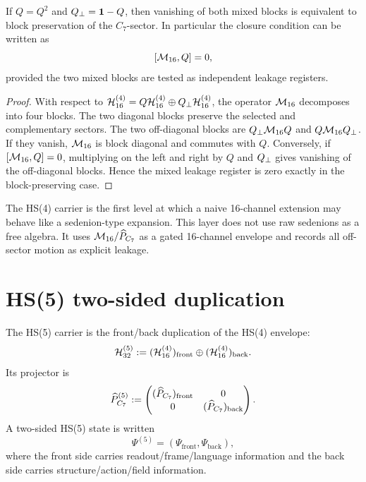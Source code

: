 \begin{lemma}
If \(Q=Q^2\) and \(Q_{\perp}=\mathbf 1-Q\), then vanishing of both mixed blocks is equivalent to block preservation of the \(C_7\)-sector. In particular the closure condition can be written as
\[
[\mathcal M_{16},Q]=0,
\]
provided the two mixed blocks are tested as independent leakage registers.
\end{lemma}

\begin{proof}
With respect to \(\mathcal H^{(4)}_{16}=Q\mathcal H^{(4)}_{16}\oplus Q_{\perp}\mathcal H^{(4)}_{16}\), the operator \(\mathcal M_{16}\) decomposes into four blocks. The two diagonal blocks preserve the selected and complementary sectors. The two off-diagonal blocks are \(Q_{\perp}\mathcal M_{16} Q\) and \(Q\mathcal M_{16}Q_{\perp}\). If they vanish, \(\mathcal M_{16}\) is block diagonal and commutes with \(Q\). Conversely, if \([\mathcal M_{16},Q]=0\), multiplying on the left and right by \(Q\) and \(Q_{\perp}\) gives vanishing of the off-diagonal blocks. Hence the mixed leakage register is zero exactly in the block-preserving case.
\end{proof}

\begin{remark}
The HS(4) carrier is the first level at which a naive 16-channel extension may behave like a sedenion-type expansion. This layer does not use raw sedenions as a free algebra. It uses \(\mathcal M_{16}/\widehat P_{C_7}\) as a gated 16-channel envelope and records all off-sector motion as explicit leakage.
\end{remark}

\section{HS(5) two-sided duplication}

\begin{definition}
The HS(5) carrier is the front/back duplication of the HS(4) envelope:
\[
\mathcal H^{(5)}_{32}
:=
(\mathcal H^{(4)}_{16})_{\mathrm{front}}\oplus(\mathcal H^{(4)}_{16})_{\mathrm{back}}.
\]
Its projector is
\[
\widehat P_{C_7}^{(5)}
:=
\begin{pmatrix}
(\widehat P_{C_7})_{\mathrm{front}}&0\\
0&(\widehat P_{C_7})_{\mathrm{back}}
\end{pmatrix}.
\]
A two-sided HS(5) state is written
\[
\Psi^{(5)}=(\Psi_{\mathrm{front}},\Psi_{\mathrm{back}}),
\]
where the front side carries readout/frame/language information and the back side carries structure/action/field information.
\end{definition}

